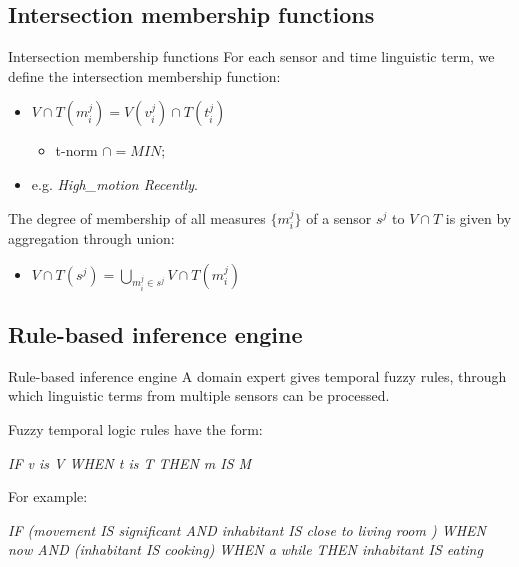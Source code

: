 \documentclass[9pt, handout]{beamer}
\begin{document}
    \subsection{Intersection membership functions}
      \begin{frame}{Intersection membership functions}
        \pause
        For each sensor and time linguistic term, we define the intersection membership function:
        \pause
        \begin{itemize}
          \item $V \cap T (m^j_i) = V(v^j_i) \cap T(t^j_i)$
          \begin{itemize}
            \item t-norm $\cap = MIN$;
          \end{itemize}
          \pause
          \item e.g. \textit{High\_motion Recently}.
        \end{itemize}
        
        \pause
        
        \pause
        The degree of membership of all measures $\{m^j_i\}$ of a sensor $s^j$ to $V \cap T$ is given by aggregation through union:
        \pause
        \begin{itemize}
          \item $V \cap T(s^j) = \bigcup_{m^j_i \in s^j} V \cap T (m^j_i)$
        \end{itemize}
      \end{frame}
      
    \subsection{Rule-based inference engine}
      \begin{frame}{Rule-based inference engine}
        \pause
        A domain expert gives temporal fuzzy rules, through which linguistic terms from multiple sensors can be processed.
        
        \pause
        \vspace{1.5em}
        Fuzzy temporal logic rules have the form:
        \pause
        \begin{center}
          \textit{IF v is V WHEN t is T THEN m IS M}
        \end{center}
        
        \pause
        \vspace{1.5em}
        For example:
        \begin{center}
          \textit{IF (movement IS significant AND inhabitant IS close to living room ) WHEN now AND (inhabitant IS cooking) WHEN a while THEN inhabitant IS eating}
        \end{center}
      \end{frame}
    
\end{document}
